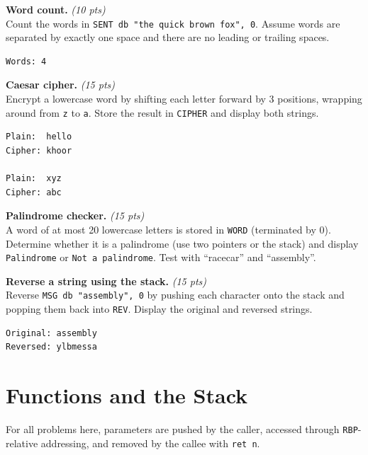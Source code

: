 \documentclass[11pt,letterpaper]{article}
\newcommand{\pts}[1]{\hfill\textit{(#1 pts)}}
\newcommand{\ttl}[1]{\textbf{#1.}}
\begin{document}
\begin{problems}
\item \ttl{Word count} \pts{10}
\\Count the words in \texttt{SENT db "the quick brown fox", 0}. Assume words are separated by exactly one space and there are no leading or trailing spaces.
\begin{lstlisting}[style=out]
Words: 4
\end{lstlisting}

\item \ttl{Caesar cipher} \pts{15}
\\Encrypt a lowercase word by shifting each letter forward by 3 positions, wrapping around from \texttt{z} to \texttt{a}. Store the result in \texttt{CIPHER} and display both strings.
\begin{lstlisting}[style=out]
Plain:  hello
Cipher: khoor

Plain:  xyz
Cipher: abc
\end{lstlisting}

\item \ttl{Palindrome checker} \pts{15}
\\A word of at most 20 lowercase letters is stored in \texttt{WORD} (terminated by 0). Determine whether it is a palindrome (use two pointers or the stack) and display \texttt{Palindrome} or \texttt{Not a palindrome}. Test with ``racecar'' and ``assembly''.

\item \ttl{Reverse a string using the stack} \pts{15}
\\Reverse \texttt{MSG db "assembly", 0} by pushing each character onto the stack and popping them back into \texttt{REV}. Display the original and reversed strings.
\begin{lstlisting}[style=out]
Original: assembly
Reversed: ylbmessa
\end{lstlisting}

\end{problems}

\section{Functions and the Stack}

For all problems here, parameters are pushed by the caller, accessed through \texttt{RBP}-relative addressing, and removed by the callee with \texttt{ret n}.
\end{document}
